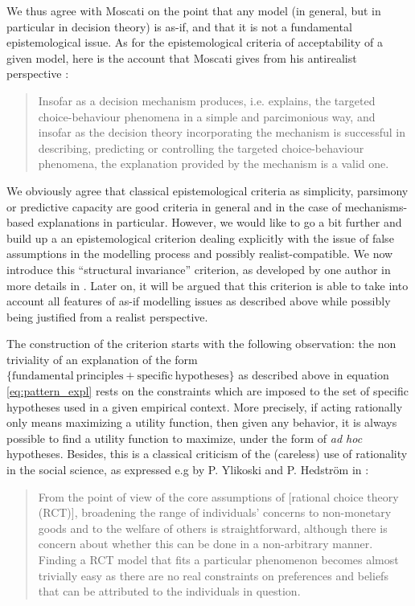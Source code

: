 \documentclass[a4paper,11pt]{article}
\theoremstyle{definition}
\begin{document}
We thus agree with Moscati on the point that any model (in general, but in particular in decision theory) is as-if, and that it is not a fundamental epistemological issue. As for the epistemological criteria of acceptability of a given model, here is the account that Moscati gives from his antirealist perspective  \citep[p.~22]{Moscati2023}: 

\begin{quote}
Insofar as a decision mechanism produces, i.e. explains, the targeted choice-behaviour phenomena in a simple and parcimonious way, and insofar as the decision theory incorporating the mechanism is successful \textelp{} in describing, predicting or controlling the targeted choice-behaviour phenomena, the explanation provided by the mechanism is a valid one.
\end{quote}

We obviously agree that classical epistemological criteria as simplicity, parsimony or predictive capacity are good criteria in general and in the case of mechanisms-based explanations in particular. However, we would like to go a bit further and build up a an epistemological criterion dealing explicitly with the issue of false assumptions in the modelling process and possibly realist-compatible. We now introduce this ``structural invariance'' criterion, as developed by one author in more details in \citep{attard_rationality}. Later on, it will be argued that this criterion is able to take into account all features of as-if modelling issues as described above while possibly being justified from a realist perspective.

The construction of the criterion starts with the following observation: the non triviality of an explanation of the form $\{\mathrm{fundamental~principles + specific~hypotheses}\}$ as described above in equation \eqref{eq:pattern_expl} rests on the constraints which are imposed to the set of specific hypotheses used in a given empirical context. More precisely, if acting rationally only means maximizing a utility function, then given any behavior, it is always possible to find a utility function to maximize, under the form of \textit{ad hoc} hypotheses. Besides, this is a classical criticism of the (careless) use of rationality in the social science, as expressed e.g by P. Ylikoski and P. Hedström in \citep[Chapter~2,~pp.~59-60]{Manzo2014}:
\begin{quote}
From the point of view of the core assumptions of [rational choice theory (RCT)], broadening the range of individuals’ concerns to non-monetary goods and to the welfare of others is straightforward, although there is concern about whether this can be done in a non-arbitrary manner. \textelp{} Finding a RCT model that fits a particular phenomenon becomes almost trivially easy as there are no real constraints on preferences and beliefs that can be attributed to the individuals in question.
\end{quote}
\end{document}
